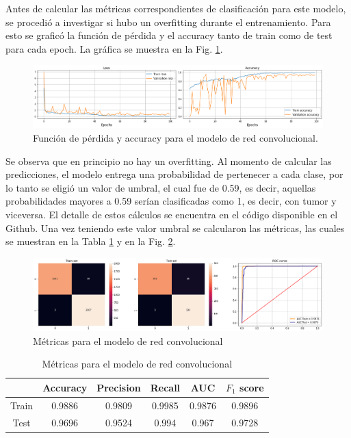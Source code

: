 Antes de calcular las métricas correspondientes de clasificación para este modelo, se procedió a investigar si hubo un overfitting durante el entrenamiento. Para esto se graficó la función de pérdida y el accuracy tanto de train como de test para cada epoch. La gráfica se muestra en la Fig. \ref{fig.loss}. 


\begin{figure}[H]
\centering
        \includegraphics[width=\linewidth]{chapters/deteccion/images/loss.png}
        \caption{Función de pérdida y accuracy para el modelo de red convolucional.}
        \label{fig.loss}
  \end{figure}

Se observa que en principio no hay un overfitting. Al momento de calcular las predicciones, el modelo entrega una probabilidad de pertenecer a cada clase, por lo tanto se eligió un valor de umbral, el cual fue de 0.59, es decir, aquellas probabilidades mayores a 0.59 serían clasificadas como 1, es decir, con tumor y viceversa. El detalle de estos cálculos se encuentra en el código disponible en el Github. Una vez teniendo este valor umbral se calcularon las métricas, las cuales se muestran en la Tabla \ref{tabla.cnn} y en la Fig. \ref{fig.cnn_me}.


\begin{figure}[H]
\centering
        \includegraphics[width=\linewidth]{chapters/deteccion/images/cnn_met.png}
        \caption{Métricas para el modelo de red convolucional}
        \label{fig.cnn_me}
  \end{figure}

\begin{table}[H]
\centering
\begin{tabular}{|c|c|c|c|c|c|}
\hline
      & Accuracy & Precision & Recall & AUC    & $F_1$ score \\ \hline
Train & 0.9886   & 0.9809    & 0.9985 & 0.9876 & 0.9896      \\ \hline
Test  & 0.9696      & 0.9524    & 0.994 & 0.967  & 0.9728      \\ \hline
\end{tabular}
\caption{Métricas para el modelo de red convolucional}
\label{tabla.cnn}
\end{table}

